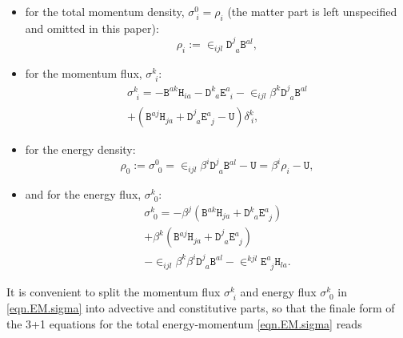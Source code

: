 \documentclass[
10pt, %
a4paper, %
oneside, %
twocolumn,
headinclude,footinclude, %
BCOR5mm, %
]{scrartcl}
\newcommand{\Dfin}[2]{\mathtt{D}_{\phantom{#2}#1}^{#2}}	%
\newcommand{\Hfin}[2]{\mathtt{H}_{#2#1}}	%
\newcommand{\Efin}[2]{\mathtt{E}^{#1}_{\phantom{#1}#2}}	%
\newcommand{\Ufin}{\mathtt{U}}
\newcommand{\Bfin}[2]{\mathtt{B}^{#1#2}}	%
\newcommand{\EMmat}[2]{\sigma^{#1}_{\ \,#2}}
\newcommand{\LCsymb}{\bm{\in}}    %
\newcommand{\KD}[2]{\delta^{#1}_{\ #2}}
\begin{document}
	\begin{itemize}
		\item 
		for the total momentum density, $ \sigma^0_{\ i} = \rho_i $ (the matter part is left 
		unspecified and omitted in this paper):
		\begin{equation}\label{eqn.sigma0i}
			\rho_i :=\LCsymb_{ijl}\Dfin{a}{j}\Bfin{a}{l},
		\end{equation}
		\item
		for the momentum flux, $ \EMmat{k}{i}$:
		\begin{multline}\label{eqn.sigmaki}
			\EMmat{k}{i} = -\Bfin{a}{k} \Hfin{a}{i} - \Dfin{a}{k} \Efin{a}{i}  
			- \LCsymb_{ijl} 
			\beta^k \Dfin{a}{j}\Bfin{a}{l} \\
			+ (\Bfin{a}{j} \Hfin{a}{j} + \Dfin{a}{j} \Efin{a}{j} 
			- \Ufin)\KD{k}{i},
		\end{multline}
		\item
		for the energy density:
		\begin{equation}\label{eqn.sigma00}
			\rho_0 :=\EMmat{0}{0} = \LCsymb_{ijl} 
			\beta^i\Dfin{a}{j}\Bfin{a}{l} - \Ufin = \beta^i 
			\rho_i 
			- \Ufin,
		\end{equation}
		\item
		and for the energy flux, $ \EMmat{k}{0} $:
		\begin{multline}\label{eqn.sigmak0}
			{\EMmat{k}{0}} = -\beta^j( \Bfin{a}{k} \Hfin{a}{j} + \Dfin{a}{k} \Efin{a}{j}) \\
			+
			\beta^k( \Bfin{a}{j} \Hfin{a}{j} + \Dfin{a}{j} \Efin{a}{j}) \\
			-
			\LCsymb_{ijl}\beta^k\beta^i\Dfin{a}{j}\Bfin{a}{l}
			-
			\LCsymb^{kjl} \Efin{a}{j}\Hfin{a}{l}.
		\end{multline}
	\end{itemize}
	It is convenient to split the momentum flux $ \EMmat{k}{i} $ and energy
	flux $ \EMmat{k}{0} $ in \eqref{eqn.EM.sigma} into advective and
	constitutive parts, so that the finale form of the 3+1 equations for the
	total energy-momentum \eqref{eqn.EM.sigma} reads
\end{document}
